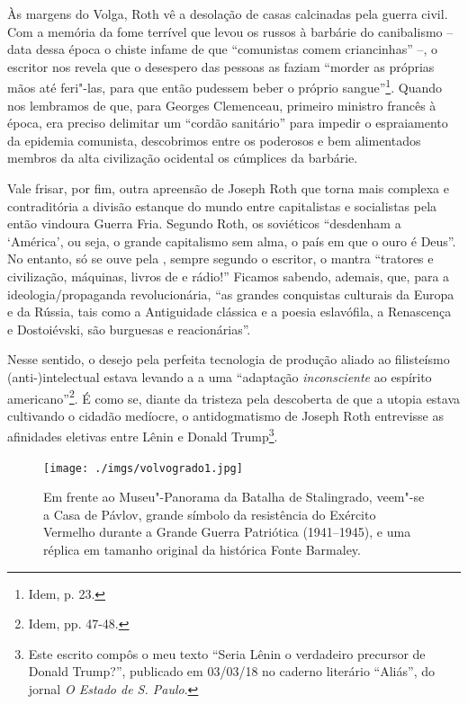 Às margens do Volga, Roth vê a desolação de casas calcinadas pela guerra
civil. Com a memória da fome terrível que levou os russos à barbárie do
canibalismo -- data dessa época o chiste infame de que ``comunistas
comem criancinhas'' --, o escritor nos revela que o desespero das
pessoas as faziam ``morder as próprias mãos até feri"-las, para que então
pudessem beber o próprio sangue''\footnote{Idem, p. 23.}. Quando nos
lembramos de que, para Georges Clemenceau, primeiro ministro francês à
época, era preciso delimitar um ``cordão sanitário'' para impedir o
espraiamento da epidemia comunista, descobrimos entre os poderosos e bem
alimentados membros da alta civilização ocidental os cúmplices da
barbárie.

Vale frisar, por fim, outra apreensão de Joseph Roth que torna mais
complexa e contraditória a divisão estanque do mundo entre capitalistas
e socialistas pela então vindoura Guerra Fria. Segundo Roth, os
soviéticos ``desdenham a `América', ou seja, o grande capitalismo sem
alma, o país em que o ouro é Deus''. No entanto, só se ouve pela ,
sempre segundo o escritor, o mantra ``tratores e civilização, máquinas,
livros de  e rádio!'' Ficamos sabendo, ademais, que, para a
ideologia/propaganda revolucionária, ``as grandes conquistas culturais
da Europa e da Rússia, tais como a Antiguidade clássica e a poesia
eslavófila, a Renascença e Dostoiévski, são burguesas e reacionárias''.

Nesse sentido, o desejo pela perfeita tecnologia de produção aliado ao
filisteísmo (anti-)intelectual estava levando a  a uma ``adaptação
\emph{inconsciente} ao espírito americano''\footnote{Idem, pp. 47-48.}.
É como se, diante da tristeza pela descoberta de que a utopia estava
cultivando o cidadão medíocre, o antidogmatismo de Joseph Roth
entrevisse as afinidades eletivas entre Lênin e Donald Trump\footnote{Este
  escrito compôs o meu texto ``Seria Lênin o verdadeiro precursor de
  Donald Trump?'', publicado em 03/03/18 no caderno literário ``Aliás'',
  do jornal \emph{O Estado de S. Paulo}.}.



\movetoevenpage
\begin{absolutelynopagebreak}
\begin{vplace}
\begin{figure}[H]
\begin{adjustwidth}{-1.8cm}{}
  \vspace{2.7cm}
  \texttt{[image: ./imgs/volvogrado1.jpg]}  
\end{adjustwidth}
  \caption{Em frente ao Museu"-Panorama da Batalha de Stalingrado, veem"-se a Casa de Pávlov, grande símbolo da resistência do Exército Vermelho durante a Grande Guerra Patriótica (1941--1945), e uma réplica em tamanho original da histórica Fonte Barmaley.}

\thispagestyle{empty}

\end{figure}
\end{vplace}

\end{absolutelynopagebreak}

